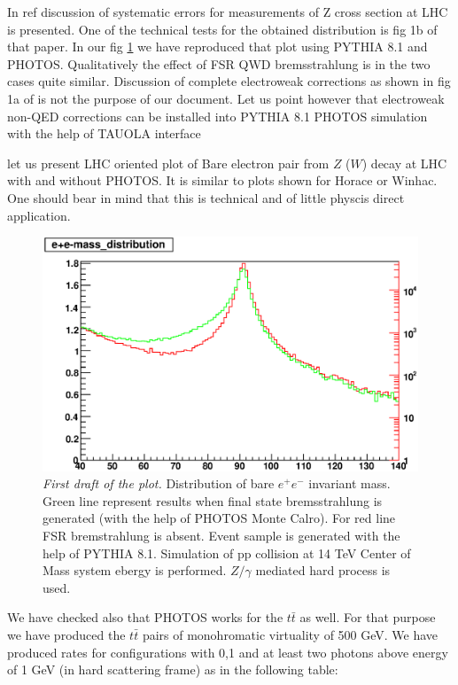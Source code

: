 \documentclass[]{Photos_interface_design}
\begin{document}
In ref \cite{Adam:2008ge} discussion of systematic errors for measurements of Z cross 
section at LHC is presented. One of the technical tests for the obtained 
distribution is fig 1b of that paper. In our fig \ref{fig:lineshape} we have 
reproduced that plot using PYTHIA 8.1 and PHOTOS. Qualitatively the effect
of FSR QWD bremsstrahlung is in the two cases quite similar. Discussion
of complete electroweak corrections as shown in fig 1a of  \cite{Adam:2008ge}
is not the purpose of our document. Let us point however that electroweak 
non-QED corrections can be installed into PYTHIA 8.1 PHOTOS simulation with 
the help of TAUOLA interface \cite{Davidson:2010rw}

let us present LHC oriented plot of Bare electron pair from $Z$ ($W$) decay 
at LHC 
with and without PHOTOS. It is similar to plots shown for Horace or Winhac. 
One should bear in mind that this is technical and of little physcis direct 
application.
\begin{figure}[h!]
\centering
\includegraphics[scale=0.85]{lineshape.eps}
\caption{{\it First draft of the plot.} Distribution of bare $e^+e^-$ invariant mass. Green line represent results when final state 
bremsstrahlung is generated (with the help of PHOTOS Monte Calro). For red line FSR 
bremstrahlung is absent. Event sample is generated with the help of PYTHIA 8.1.
Simulation of pp collision at 14 TeV Center of Mass system ebergy is performed.
$Z/\gamma$ mediated hard process is used.
  \label{fig:lineshape}
}
\end{figure}

We have checked also that PHOTOS works for the $t \bar t$ as well.
For that purpose we have produced the  $t \bar t$ pairs of monohromatic 
virtuality of 500 GeV. We have produced rates for configurations with 0,1 and 
at least two photons above energy of 1 GeV (in hard scattering frame)
as in the following table:
\end{document}
